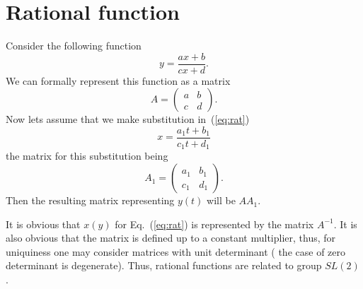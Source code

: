 \documentclass{article}
\begin{document}
\appendix
\section{Rational function}
Consider the following function
\begin{equation}
\label{eq:rat}
y = \frac{a x + b}{c x +d }.
\end{equation} 
We can formally represent this function as a matrix
\begin{equation}
A = \left(
  \begin{array}{ll}
    a  & b \\
    c  & d 
  \end{array}
\right).
\end{equation}
Now lets assume that we make substitution in~(\ref{eq:rat})
\[ x = \frac{ a_1 t + b_1 } { c_1 t +d_1} \] the matrix for this substitution being
\begin{equation}
A_1 = \left(
  \begin{array}{ll}
    a_1  & b_1 \\
    c_1  & d_1 
  \end{array}
\right).
\end{equation}
Then the resulting matrix representing $y(t)$ will be $A A_1$.

It is obvious that  $x(y)$ for  Eq.~(\ref{eq:rat}) is represented by the matrix $A^{-1}$. It is also obvious that the matrix is defined up to a constant multiplier, thus, for uniquiness one may consider matrices with unit determinant ( the case of zero determinant is degenerate). Thus, rational functions are related to group $SL(2)$.
\end{document}
